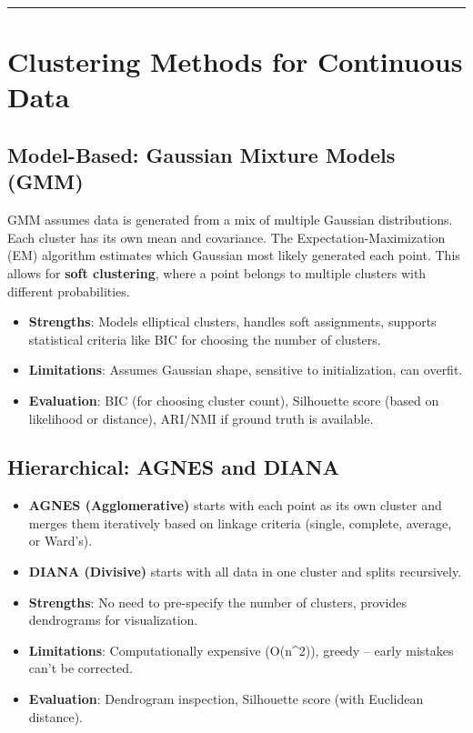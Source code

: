 \documentclass[
  letterpaper,
  DIV=11,
  numbers=noendperiod]{scrartcl}
\providecommand{\tightlist}{%
  \setlength{\itemsep}{0pt}\setlength{\parskip}{0pt}}\usepackage{longtable,booktabs,array}
\begin{document}
\begin{center}\rule{0.5\linewidth}{0.5pt}\end{center}

\section{Clustering Methods for Continuous
Data}\label{clustering-methods-for-continuous-data}

\subsection{Model-Based: Gaussian Mixture Models
(GMM)}\label{model-based-gaussian-mixture-models-gmm}

GMM assumes data is generated from a mix of multiple Gaussian
distributions. Each cluster has its own mean and covariance. The
Expectation-Maximization (EM) algorithm estimates which Gaussian most
likely generated each point. This allows for \textbf{soft clustering},
where a point belongs to multiple clusters with different probabilities.

\begin{itemize}
\tightlist
\item
  \textbf{Strengths}: Models elliptical clusters, handles soft
  assignments, supports statistical criteria like BIC for choosing the
  number of clusters.
\item
  \textbf{Limitations}: Assumes Gaussian shape, sensitive to
  initialization, can overfit.
\item
  \textbf{Evaluation}: BIC (for choosing cluster count), Silhouette
  score (based on likelihood or distance), ARI/NMI if ground truth is
  available.
\end{itemize}

\subsection{Hierarchical: AGNES and
DIANA}\label{hierarchical-agnes-and-diana}

\begin{itemize}
\item
  \textbf{AGNES (Agglomerative)} starts with each point as its own
  cluster and merges them iteratively based on linkage criteria (single,
  complete, average, or Ward's).
\item
  \textbf{DIANA (Divisive)} starts with all data in one cluster and
  splits recursively.
\item
  \textbf{Strengths}: No need to pre-specify the number of clusters,
  provides dendrograms for visualization.
\item
  \textbf{Limitations}: Computationally expensive (O(n\^{}2)), greedy --
  early mistakes can't be corrected.
\item
  \textbf{Evaluation}: Dendrogram inspection, Silhouette score (with
  Euclidean distance).
\end{itemize}
\end{document}
